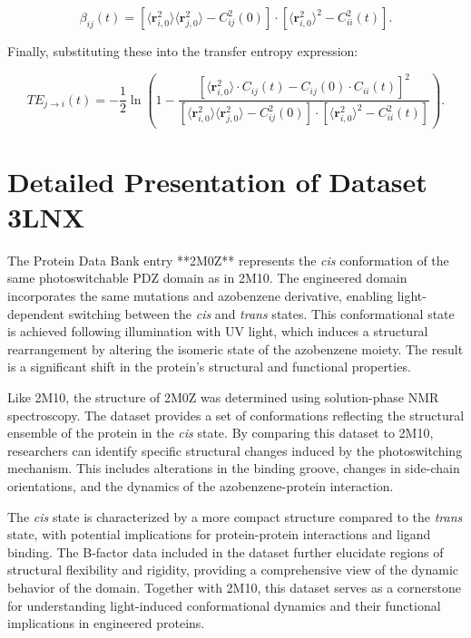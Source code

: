 \documentclass[English, Lau, oneside]{sapthesis}
\begin{document}
\begin{itemize}
\[
\beta_{ij}(t) = \left[\langle \mathbf{r}_{i,0}^2 \rangle \langle \mathbf{r}_{j,0}^2 \rangle - C_{ij}^2(0)\right] \cdot \left[\langle \mathbf{r}_{i,0}^2 \rangle^2 - C_{ii}^2(t)\right].
\]

Finally, substituting these into the transfer entropy expression:

\begin{equation}
TE_{j \to i}(t) = -\frac{1}{2} \ln \left(1 - \frac{\left[\langle \mathbf{r}_{i,0}^2 \rangle \cdot C_{ij}(t) - C_{ij}(0) \cdot C_{ii}(t)\right]^2}{\left[\langle \mathbf{r}_{i,0}^2 \rangle \langle \mathbf{r}_{j,0}^2 \rangle - C_{ij}^2(0)\right] \cdot \left[\langle \mathbf{r}_{i,0}^2 \rangle^2 - C_{ii}^2(t)\right]}\right).
\end{equation}

\section*{Detailed Presentation of Dataset 3LNX}

The Protein Data Bank entry **2M0Z** represents the \textit{cis} conformation of the same photoswitchable PDZ domain as in 2M10. The engineered domain incorporates the same mutations and azobenzene derivative, enabling light-dependent switching between the \textit{cis} and \textit{trans} states. This conformational state is achieved following illumination with UV light, which induces a structural rearrangement by altering the isomeric state of the azobenzene moiety. The result is a significant shift in the protein's structural and functional properties.

Like 2M10, the structure of 2M0Z was determined using solution-phase NMR spectroscopy. The dataset provides a set of conformations reflecting the structural ensemble of the protein in the \textit{cis} state. By comparing this dataset to 2M10, researchers can identify specific structural changes induced by the photoswitching mechanism. This includes alterations in the binding groove, changes in side-chain orientations, and the dynamics of the azobenzene-protein interaction.

The \textit{cis} state is characterized by a more compact structure compared to the \textit{trans} state, with potential implications for protein-protein interactions and ligand binding. The B-factor data included in the dataset further elucidate regions of structural flexibility and rigidity, providing a comprehensive view of the dynamic behavior of the domain. Together with 2M10, this dataset serves as a cornerstone for understanding light-induced conformational dynamics and their functional implications in engineered proteins.


\end{itemize}
\end{document}
